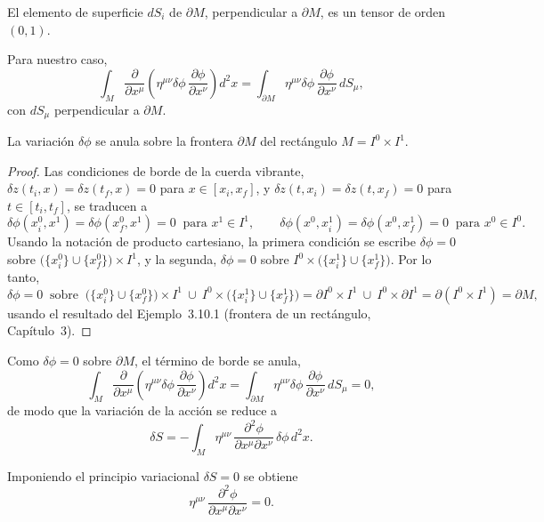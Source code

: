 \begin{definicion}
El elemento de superficie $dS_i$ de $\partial M$, perpendicular a
$\partial M$, es un tensor de orden $(0,1)$.
\end{definicion}

Para nuestro caso,
\[
\int_M \frac{\partial}{\partial x^\mu}\left(\eta^{\mu\nu}\delta\phi\,
\frac{\partial\phi}{\partial x^\nu}\right) d^2x = \int_{\partial M}
\eta^{\mu\nu}\delta\phi\, \frac{\partial\phi}{\partial x^\nu}\, dS_\mu,
\]
con $dS_\mu$ perpendicular a $\partial M$.

\begin{proposicionc}
La variación $\delta\phi$ se anula sobre la frontera $\partial M$ del
rectángulo $M=I^0\times I^1$.
\end{proposicionc}

\begin{proof}
Las condiciones de borde de la cuerda vibrante, $\delta z(t_i,x)=\delta
z(t_f,x)=0$ para $x\in[x_i,x_f]$, y $\delta z(t,x_i)=\delta z(t,x_f)=0$
para $t\in[t_i,t_f]$, se traducen a
\[
\delta\phi(x_i^0,x^1) = \delta\phi(x_f^0,x^1) = 0 \ \text{ para }
x^1\in I^1, \qquad \delta\phi(x^0,x_i^1) = \delta\phi(x^0,x_f^1) = 0 \
\text{ para } x^0\in I^0 .
\]
Usando la notación de producto cartesiano, la primera condición se
escribe $\delta\phi=0$ sobre $\big(\{x_i^0\}\cup\{x_f^0\}\big)\times
I^1$, y la segunda, $\delta\phi=0$ sobre $I^0\times\big(\{x_i^1\}\cup
\{x_f^1\}\big)$. Por lo tanto,
\[
\delta\phi = 0 \ \text{ sobre } \ \big(\{x_i^0\}\cup\{x_f^0\}\big)
\times I^1 \ \cup \ I^0\times\big(\{x_i^1\}\cup\{x_f^1\}\big) =
\partial I^0\times I^1 \ \cup \ I^0\times\partial I^1 =
\partial(I^0\times I^1) = \partial M,
\]
usando el resultado del Ejemplo~3.10.1 (frontera de un rectángulo,
Capítulo~3). \qedhere
\end{proof}

Como $\delta\phi=0$ sobre $\partial M$, el término de borde se anula,
\[
\int_M \frac{\partial}{\partial x^\mu}\left(\eta^{\mu\nu}\delta\phi\,
\frac{\partial\phi}{\partial x^\nu}\right) d^2x = \int_{\partial M}
\eta^{\mu\nu}\delta\phi\, \frac{\partial\phi}{\partial x^\nu}\, dS_\mu =
0,
\]
de modo que la variación de la acción se reduce a
\[
\delta S = -\int_M \eta^{\mu\nu}\, \frac{\partial^2\phi}{\partial
x^\mu\partial x^\nu}\, \delta\phi\, d^2x .
\]

\begin{proposicionc}
Imponiendo el principio variacional $\delta S=0$ se obtiene
\[
\eta^{\mu\nu}\, \frac{\partial^2\phi}{\partial x^\mu\partial x^\nu} = 0
.
\]
\end{proposicionc}

